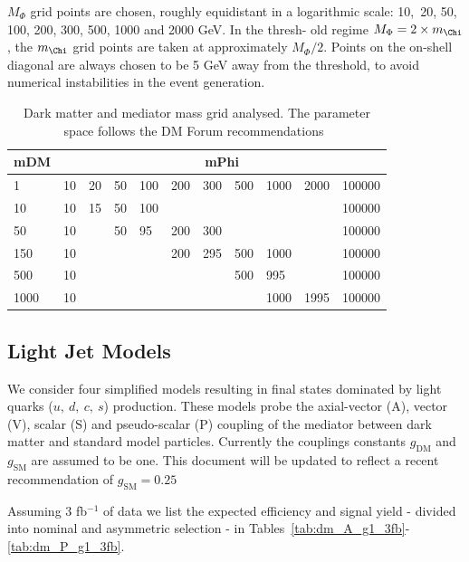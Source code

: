 $M_{\Phi}$ grid points are chosen, roughly equidistant in a logarithmic scale: 10,~20, 50, 100, 200, 300, 500, 1000 and 2000 GeV. In the thresh-
old regime $M_{\Phi} = 2 \times m_{\Chi}$, the $ m_{\Chi}$ grid points are taken at approximately $M_{\Phi}/2$. Points on the on-shell diagonal are always chosen to be
5 GeV away from the threshold, to avoid numerical instabilities in the event generation. 


\begin{table}[h!]
\centering
\begin{tabular}{l|llllllllll}\hline
mDM  & \multicolumn{10}{c}{mPhi}                                   \\ \hline
1    & 10 & 20 & 50 & 100 & 200 & 300 & 500 & 1000 & 2000 & 100000 \\
10   & 10 & 15 & 50 & 100 &     &     &     &      &      & 100000 \\
50   & 10 &    & 50 & 95  & 200 & 300 &     &      &      & 100000 \\
150  & 10 &    &    &     & 200 & 295 & 500 & 1000 &      & 100000 \\
500  & 10 &    &    &     &     &     & 500 & 995  &      & 100000 \\
1000 & 10 &    &    &     &     &     &     & 1000 & 1995 & 100000\\ \hline
\end{tabular}
\caption{Dark matter and mediator mass grid analysed. The parameter space follows the DM Forum recommendations~\cite{Abercrombie:2015wmb}}
\label{tab:DMgrid}
\end{table}

\subsection{Light Jet Models}


We consider four simplified models resulting in final states dominated by light quarks ($u,~d,~c,~s$) production. These models probe the axial-vector (A), vector (V), scalar (S) and pseudo-scalar (P) coupling of the mediator between dark matter and standard model particles. Currently the couplings constants $g_\textrm{DM}$ and $g_\textrm{SM}$ are assumed to be one. This document will be updated to reflect a recent recommendation of $g_\textrm{SM}=0.25$

Assuming 3 fb$^{-1}$ of data we list the expected efficiency and signal yield - divided into nominal and asymmetric selection - in Tables~\ref{tab:dm_A_g1_3fb}-\ref{tab:dm_P_g1_3fb}.

